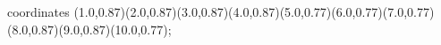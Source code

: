 					coordinates { (1.0,0.87)(2.0,0.87)(3.0,0.87)(4.0,0.87)(5.0,0.77)(6.0,0.77)(7.0,0.77)(8.0,0.87)(9.0,0.87)(10.0,0.77)};